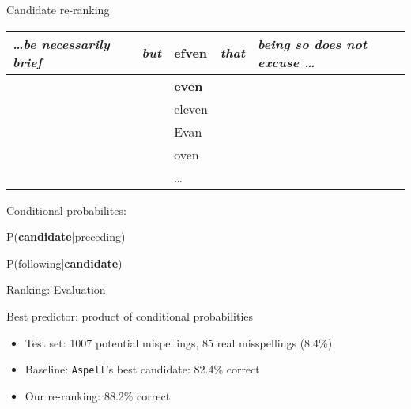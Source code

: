 \begin{frame}{Candidate re-ranking}
  
\begin{tabular}{l@{~}l@{~}|l@{~}|l@{~}l}
   \textit{\ldots be necessarily brief} &  \textit{\alert<2>{but}} & efven & \textit{\alert<3>{that}} & \textit{being so does not excuse \ldots}\\
\hline
  &   & \textbf{even} &  & \\
  &   & eleven &  & \\
  &   & Evan &  & \\
  &   & oven &  & \\
  &   & \ldots &  & 
\end{tabular}

\vspace{1cm}

Conditional probabilites:\\[1ex]

\pause

P(\textbf{candidate}|\alert<2>{preceding})

P(\alert<3>{following}|\textbf{candidate})


\end{frame}


\begin{frame}{Ranking: Evaluation}
  

Best predictor: product of conditional probabilities\\


\begin{itemize}
\item Test set: 1007 potential mispellings, 85 real misspellings (8.4\%)
\item<2-> Baseline: \texttt{Aspell}'s best candidate: 82.4\% correct
\item<3-> Our re-ranking: 88.2\% correct %
\end{itemize}

\end{frame}



